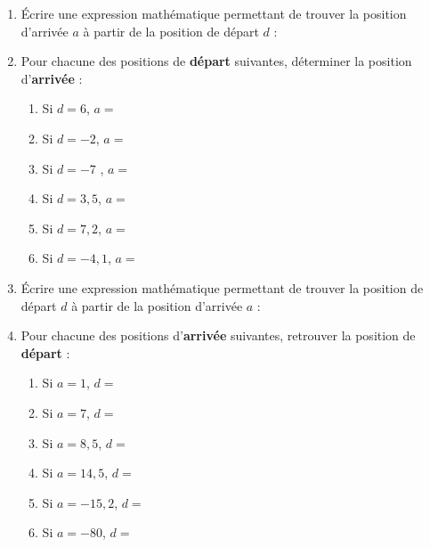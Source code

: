 \documentclass[
	classe=$2^{de}$,
	exercices=Activité\space-\space Chapitre\space 1
]{exercice}
\begin{document}
\begin{enumerate}
	\item Écrire une expression mathématique permettant de trouver la position d'arrivée $a$ à partir de la position de départ $d$ :
	      \begin{center}
	      \end{center}
	\item Pour chacune des positions de \textbf{départ} suivantes, déterminer la position d'\textbf{arrivée} :
	      \begin{multicols}{2}
		      \begin{enumerate}
			      \item Si $d = 6$, $a = $
			      \item Si $d = -2$, $a = $
			      \item Si $d = -7$ , $a = $
			      \item Si $d = 3,5$, $a = $
			      \item Si $d = 7,2$, $a = $
			      \item Si $d = -4,1$, $a = $
		      \end{enumerate}
	      \end{multicols}
	\item Écrire une expression mathématique permettant de trouver la position de départ $d$ à partir de la position d'arrivée $a$ :
	      \begin{center}
	      \end{center}
	\item Pour chacune des positions d'\textbf{arrivée} suivantes, retrouver la position de \textbf{départ} :
	      \begin{multicols}{2}
		      \begin{enumerate}
			      \item Si $a = 1$, $d = $
			      \item Si $a = 7$, $d = $
			      \item Si $a = 8,5$, $d = $
			      \item Si $a = 14,5$, $d = $
			      \item Si $a = -15,2$, $d = $
			      \item Si $a = -80$, $d = $
		      \end{enumerate}
	      \end{multicols}
\end{enumerate}
\end{document}
